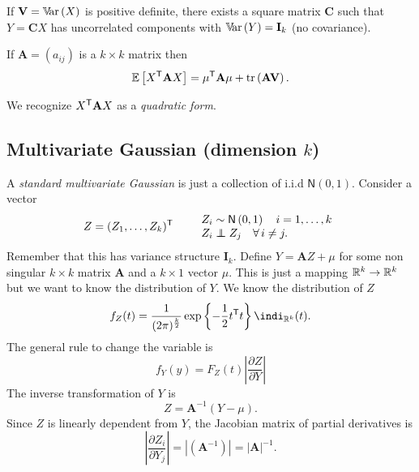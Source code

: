 \documentclass[12pt]{report}
\begin{document}
	\begin{proposition}
		If $\mathbf{V}=\mathbb{V}\!\mathrm{ar}\,(X)$ is positive definite, there exists a square matrix $\mathbf{C}$ such that $Y=\mathbf{C}X$ has uncorrelated components with $\mathbb{V}\!\mathrm{ar}\,(Y)=\mathbf{I}_{k}$ (no covariance).
	\end{proposition}
	\begin{proposition}
		If $\mathbf{A}=(a_{ij})$ is a $k\times k$ matrix then
		\begin{equation*}
			\mathbb{E}\left[X^{\mathsf{T}}\mathbf{A}X\right]=\mu^{\mathsf{T}}\mathbf{A}\mu+\mathrm{tr}\left(\mathbf{AV}\right).
		\end{equation*}
	\end{proposition}
We recognize $X^{\mathsf{T}}\mathbf{A}X$ as a \emph{quadratic form}.
\subsection{Multivariate Gaussian (dimension $k$)}
A \emph{standard multivariate Gaussian \rv{}} is just a collection of i.i.d $\mathsf{N}(0,1)$. Consider a vector 
\begin{equation*}
	Z=(Z_{1},\ldots,Z_{k})^{\trsp}\qquad \begin{array}{l}
		Z_{i}\distnorm{0,1}\quad i=1,\ldots,k\\
		Z_{i}\indep Z_{j}\quad\every i\neq j.
	\end{array}
\end{equation*} Remember that this has variance structure $\mathbf{I}_{k}$.
Define $Y=\mathbf{A}Z+\mu$ for some non singular $k\times k$ matrix $\mathbf{A}$ and a $k\times 1$ vector $\mu$. This is just a mapping $\mathbb{R}^{k}\to\mathbb{R}^{k}$ but we want to know the distribution of $Y$. We know the distribution of $Z$
\begin{equation*}
	f_{Z}(t)=\frac{1}{(2\pi)^{\frac{k}{2}}}\expg{-\unmezz t^{\trsp}t}\indi_{\R^{k}}(t).
\end{equation*}
The general rule to change the variable is
\begin{equation*}
	f_{Y}(y)=F_{Z}(t)\left|\frac{\partial Z}{\partial Y}\right|
\end{equation*}
The inverse transformation of $Y$ is
\begin{equation*}
	Z=\mathbf{A}^{-1}(Y-\mu).
\end{equation*}
Since $Z$ is linearly dependent from $Y$, the Jacobian matrix of partial derivatives is 
\begin{equation*}
	\left|\frac{\partial Z_{i}}{\partial Y_{j}}\right|=\left|\left(\mathbf{A}^{-1}\right)\right|=|\mathbf{A}|^{-1}.
\end{equation*}
\end{document}
